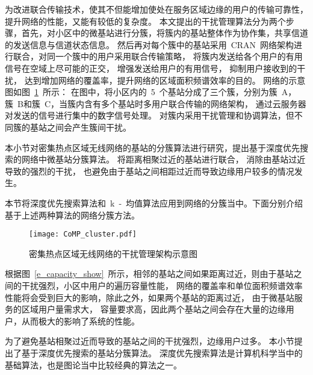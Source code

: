 为改进联合传输技术，使其不但能增加使处在服务区域边缘的用户的传输可靠性，提升网络的性能，又能有较低的复杂度。
本文提出的干扰管理算法分为两个步骤，首先，对小区中的微基站进行分簇，将簇内的基站整体作为协作集，共享信道的发送信息与信道状态信息。
然后再对每个簇中的基站采用~CRAN~网络架构进行联合，对同一个簇中的用户采用联合传输策略，
将簇内发送给各个用户的有用信号在空域上尽可能的正交，
增强发送给用户的有用信号，
抑制用户接收到的干扰，
达到增加网络的覆盖率，提升网络的区域面积频谱效率的目的。
网络的示意图如图~\ref{CoMP_cluster}~所示：
在图中，将小区内的~5~个基站分成了三个簇，分别为簇~A，簇~B和簇~C，当簇内含有多个基站时多用户联合传输的网络架构，
通过云服务器对发送的信号进行集中的数字信号处理。
对簇内采用干扰管理和协调算法，但不同簇的基站之间会产生簇间干扰。


本小节对密集热点区域无线网络的基站的分簇算法进行研究，提出基于深度优先搜索的网络中微基站分簇算法。
将距离相聚过近的基站进行联合，
消除由基站过近导致的强烈的干扰，
也避免由于基站之间相距过近而导致边缘用户较多的情况发生。

本节将深度优先搜索算法和~k~-~均值算法应用到网络的分簇当中。下面分别介绍基于上述两种算法的网络分簇方法。
\begin{figure}[htbp]
\centering
\texttt{[image: CoMP\_cluster.pdf]}
\caption{密集热点区域无线网络的干扰管理架构示意图}\vspace{-0.5em}
\label{CoMP_cluster}
\end{figure}
根据图~\ref{e_capacity_show}~所示，相邻的基站之间如果距离过近，则由于基站之间的干扰强烈，小区中用户的遍历容量性能，
网络的覆盖率和单位面积频谱效率性能将会受到巨大的影响，除此之外，如果两个基站的距离过近，
由于微基站服务的区域用户量需求大，
容量要求高，因此两个基站之间会存在大量的边缘用户，从而极大的影响了系统的性能。

为了避免基站相聚过近而导致的基站之间的干扰强烈，边缘用户过多。
本小节提出了基于深度优先搜索的基站分簇算法。
深度优先搜索算法是计算机科学当中的基础算法，也是图论当中比较经典的算法之一。

